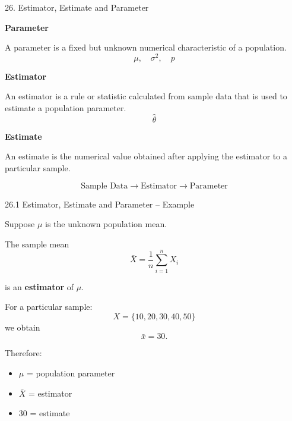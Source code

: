\begin{frame}{26. Estimator, Estimate and Parameter}

\textbf{Parameter}

A parameter is a fixed but unknown numerical characteristic
of a population.
\[
\mu,\quad \sigma^2,\quad p
\]

\vspace{0.1cm}

\textbf{Estimator}

An estimator is a rule or statistic calculated from sample data
that is used to estimate a population parameter.
\[
\hat{\theta}
\]

\vspace{0.1cm}

\textbf{Estimate}

An estimate is the numerical value obtained after applying
the estimator to a particular sample.

\vspace{0.1cm}
\[
\boxed{
\text{Sample Data}
\longrightarrow
\text{Estimator}
\longrightarrow
\text{Parameter}
}
\]

\end{frame}



\begin{frame}{26.1 Estimator, Estimate and Parameter -- Example}

Suppose $\mu$ is the unknown population mean.

The sample mean
\[
\bar{X}
=
\frac{1}{n}
\sum_{i=1}^{n}X_i
\]

is an \textbf{estimator} of $\mu$.

For a particular sample:
\[
X=\{10,20,30,40,50\}
\]
we obtain
\[
\bar{x}=30.
\]

Therefore:

\begin{itemize}
    \item $\mu$ = population parameter
    \item $\bar{X}$ = estimator
    \item $30$ = estimate
\end{itemize}

\end{frame}



